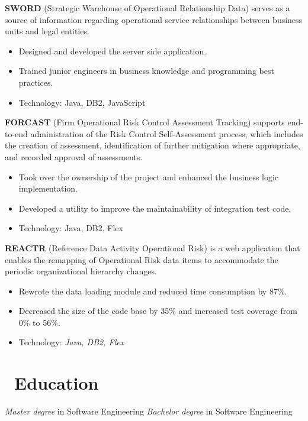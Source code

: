 \documentclass{resume}
\begin{document}
\textbf{SWORD} (Strategic Warehouse of Operational Relationship Data) serves as a source of information regarding operational service relationships between business units and legal entities.
\begin{itemize}
  \item Designed and developed the server side application.
  \item Trained junior engineers in business knowledge and programming best practices.
  \item Technology: Java, DB2, JavaScript
\end{itemize}


\textbf{FORCAST} (Firm Operational Risk Control Assessment Tracking) supports end-to-end administration of the Risk Control Self-Assessment process, which includes the creation of assessment, identification of further mitigation where appropriate, and recorded approval of assessments.
\begin{itemize}
  \item Took over the ownership of the project and enhanced the business logic implementation.
  \item Developed a utility to improve the maintainability of integration test code.
  \item Technology: Java, DB2, Flex
\end{itemize}

\textbf{REACTR} (Reference Data Activity Operational Risk) is a web application that enables the remapping of Operational Risk data items to accommodate the periodic organizational hierarchy changes.

\begin{itemize}
  \item Rewrote the data loading module and reduced time consumption by 87\%.
  \item Decreased the size of the code base by 35\% and increased test coverage from 0\% to 56\%.
  \item Technology: \textit{Java, DB2, Flex}
\end{itemize}

\section{\faGraduationCap\ Education}
\textit{Master degree} in Software Engineering
\textit{Bachelor degree} in Software Engineering
\end{document}
